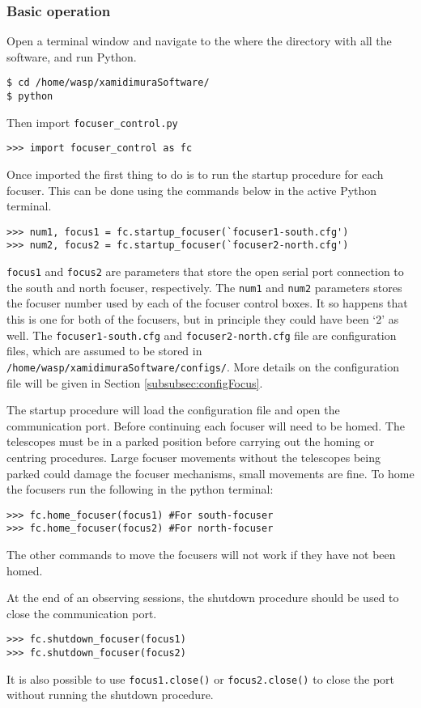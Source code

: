 \documentclass[a4paper,12pt]{article}
\begin{document}
\subsubsection{Basic operation}

Open a terminal window and navigate to the where the directory with all the software, and run Python. 
\begin{verbatim}
$ cd /home/wasp/xamidimuraSoftware/
$ python
\end{verbatim}
Then import {\tt focuser\_control.py}
\begin{verbatim}
>>> import focuser_control as fc
\end{verbatim}
Once imported the first thing to do is to run the startup procedure for each focuser. This can be done using the commands below in the active Python terminal.
\begin{verbatim}
>>> num1, focus1 = fc.startup_focuser(`focuser1-south.cfg')
>>> num2, focus2 = fc.startup_focuser(`focuser2-north.cfg')
\end{verbatim}
{\tt focus1} and {\tt focus2} are parameters that store the open serial port connection to the south and north focuser, respectively. The {\tt num1} and {\tt num2} parameters stores the focuser number used by each of the focuser control boxes. It so happens that this is one for both of the focusers, but in principle they could have been `2' as well. The {\tt focuser1-south.cfg} and {\tt focuser2-north.cfg} file are configuration files, which are assumed to be stored in {\tt /home/wasp/xamidimuraSoftware/configs/}. More details on the configuration file will be given in Section \ref{subsubsec:configFocus}.

The startup procedure will load the configuration file and open the communication port. Before continuing each focuser will need to be homed. The telescopes must be in a parked position before carrying out the homing or centring procedures. Large focuser movements without the telescopes being parked could damage the focuser mechanisms, small movements are fine. To home the focusers run the following in the python terminal:
\begin{verbatim}
>>> fc.home_focuser(focus1) #For south-focuser
>>> fc.home_focuser(focus2) #For north-focuser
\end{verbatim}
The other commands to move the focusers will not work if they have not been homed.

At the end of an observing sessions, the shutdown procedure should be used to close the communication port.
\begin{verbatim}
>>> fc.shutdown_focuser(focus1)
>>> fc.shutdown_focuser(focus2)
\end{verbatim}
It is also possible to use {\tt focus1.close()} or {\tt focus2.close()} to close the port without running the shutdown procedure.
\end{document}
